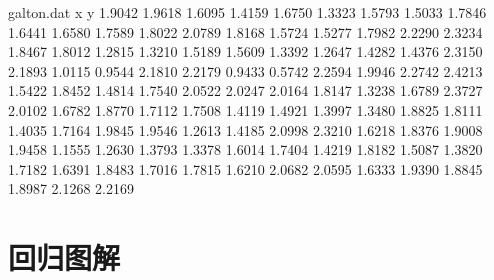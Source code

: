 \documentclass[a4paper]{article}
\begin{document}
\begin{filecontents*}{galton.dat}
     x      y
1.9042 1.9618
1.6095 1.4159
1.6750 1.3323
1.5793 1.5033
1.7846 1.6441
1.6580 1.7589
1.8022 2.0789
1.8168 1.5724
1.5277 1.7982
2.2290 2.3234
1.8467 1.8012
1.2815 1.3210
1.5189 1.5609
1.3392 1.2647
1.4282 1.4376
2.3150 2.1893
1.0115 0.9544
2.1810 2.2179
0.9433 0.5742
2.2594 1.9946
2.2742 2.4213
1.5422 1.8452
1.4814 1.7540
2.0522 2.0247
2.0164 1.8147
1.3238 1.6789
2.3727 2.0102
1.6782 1.8770
1.7112 1.7508
1.4119 1.4921
1.3997 1.3480
1.8825 1.8111
1.4035 1.7164
1.9845 1.9546
1.2613 1.4185
2.0998 2.3210
1.6218 1.8376
1.9008 1.9458
1.1555 1.2630
1.3793 1.3378
1.6014 1.7404
1.4219 1.8182
1.5087 1.3820
1.7182 1.6391
1.8483 1.7016
1.7815 1.6210
2.0682 2.0595
1.6333 1.9390
1.8845 1.8987
2.1268 2.2169
\end{filecontents*}


\section{回归图解}

\def\hscale{1}
\def\stderr{0.5}
\def\fromto{2}
\end{document}
